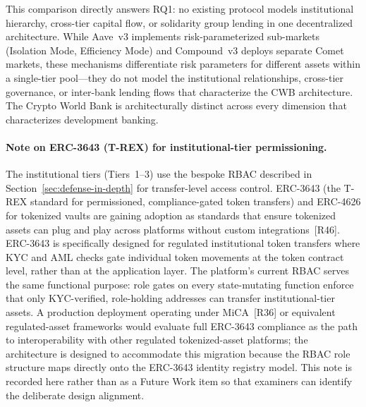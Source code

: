 \documentclass[12pt,a4paper]{report}
\begin{document}
This comparison directly answers RQ1: no existing protocol models institutional hierarchy, cross-tier capital flow, or solidarity group lending in one decentralized architecture. While Aave~v3 implements risk-parameterized sub-markets (Isolation Mode, Efficiency Mode) and Compound~v3 deploys separate Comet markets, these mechanisms differentiate risk parameters for different assets within a single-tier pool---they do not model the institutional relationships, cross-tier governance, or inter-bank lending flows that characterize the CWB architecture. The Crypto World Bank is architecturally distinct across every dimension that characterizes development banking.

\paragraph{Note on ERC-3643 (T-REX) for institutional-tier permissioning.}
The institutional tiers (Tiers~1--3) use the bespoke RBAC described in Section~\ref{sec:defense-in-depth} for transfer-level access control.  ERC-3643 (the T-REX standard for permissioned, compliance-gated token transfers) and ERC-4626 for tokenized vaults are gaining adoption as standards that ensure tokenized assets can plug and play across platforms without custom integrations~[R46].  ERC-3643 is specifically designed for regulated institutional token transfers where KYC and AML checks gate individual token movements at the token contract level, rather than at the application layer.  The platform's current RBAC serves the same functional purpose: role gates on every state-mutating function enforce that only KYC-verified, role-holding addresses can transfer institutional-tier assets.  A production deployment operating under MiCA~[R36] or equivalent regulated-asset frameworks would evaluate full ERC-3643 compliance as the path to interoperability with other regulated tokenized-asset platforms; the architecture is designed to accommodate this migration because the RBAC role structure maps directly onto the ERC-3643 identity registry model.  This note is recorded here rather than as a Future Work item so that examiners can identify the deliberate design alignment.
\end{document}
